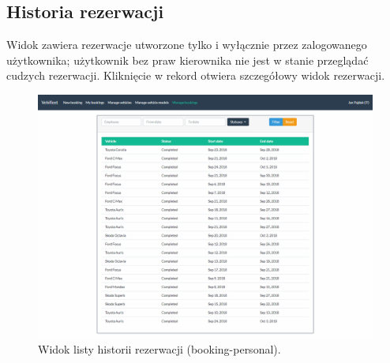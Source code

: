 \documentclass[eng,printmode,openany]{mgr}
\begin{document}
\begin{appendices}
		\section{Historia rezerwacji}
		Widok zawiera rezerwacje utworzone tylko i wyłącznie przez zalogowanego użytkownika; użytkownik bez praw kierownika nie jest w stanie przeglądać cudzych rezerwacji. Kliknięcie w rekord otwiera szczegółowy widok rezerwacji.
		\begin{figure}[H]
			\centering
			\includegraphics[width=\textwidth]{images/views/booking-list-manage.png}
			\caption{Widok listy historii rezerwacji (booking-personal).}	
		\end{figure}
		
		\newpage

\end{appendices}
\end{document}
